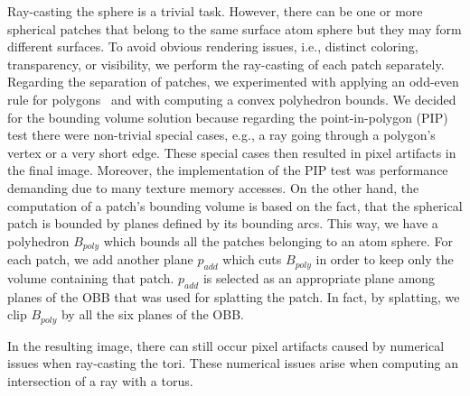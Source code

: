 Ray-casting the sphere is a trivial task. 
However, there can be one or more spherical patches that belong to the same surface atom sphere but they may form different surfaces.
To avoid obvious rendering issues, i.e., distinct coloring, transparency, or visibility, we perform the ray-casting of each patch separately.
Regarding the separation of patches, we experimented with applying an odd-even rule for polygons~\cite{shimrat1962algorithm} and with computing a convex polyhedron bounds.
We decided for the bounding volume solution because regarding the point-in-polygon (PIP) test there were non-trivial special cases, e.g., a ray going through a polygon's vertex or a very short edge.
These special cases then resulted in pixel artifacts in the final image.
Moreover, the implementation of the PIP test was performance demanding due to many texture memory accesses.
On the other hand, the computation of a patch's bounding volume is based on the fact, that the spherical patch is bounded by planes defined by its bounding arcs.
This way, we have a polyhedron $B_{poly}$ which bounds all the patches belonging to an atom sphere.
For each patch, we add another plane $p_{add}$ which cuts $B_{poly}$ in order to keep only the volume containing that patch.
$p_{add}$ is selected as an appropriate plane among planes of the OBB that was used for splatting the patch.
In fact, by splatting, we clip $B_{poly}$ by all the six planes of the OBB.

In the resulting image, there can still occur pixel artifacts caused by numerical issues when ray-casting the tori.
These numerical issues arise when computing an intersection of a ray with a torus.

